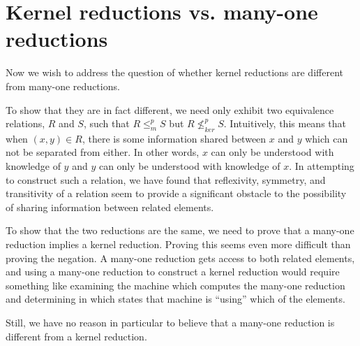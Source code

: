 \documentclass{amsart}
\theoremstyle{definition} \newtheorem{definition}[definition]{Definition}
\newcommand{\nkr}{\nleq^{p}_{ker}} %
\newcommand{\mor}{\leq^{p}_{m}} %
\begin{document}

\section{Kernel reductions vs. many-one reductions}

Now we wish to address the question of whether kernel reductions are different
from many-one reductions.

To show that they are in fact different, we need only exhibit two equivalence
relations, $R$ and $S$, such that $R\mor S$ but $R\nkr S$. Intuitively, this
means that when $(x,y)\in R$, there is some information shared between $x$ and
$y$ which can not be separated from either. In other words, $x$ can only be
understood with knowledge of $y$ and $y$ can only be understood with knowledge
of $x$. In attempting to construct such a relation, we have found that
reflexivity, symmetry, and transitivity of a relation seem to provide a
significant obstacle to the possibility of sharing information between related
elements.

To show that the two reductions are the same, we need to prove that a many-one
reduction implies a kernel reduction. Proving this seems even more difficult
than proving the negation. A many-one reduction gets access to both related
elements, and using a many-one reduction to construct a kernel reduction would
require something like examining the machine which computes the many-one
reduction and determining in which states that machine is ``using'' which of
the elements.

Still, we have no reason in particular to believe that a many-one reduction is
different from a kernel reduction.

 
\end{document}
